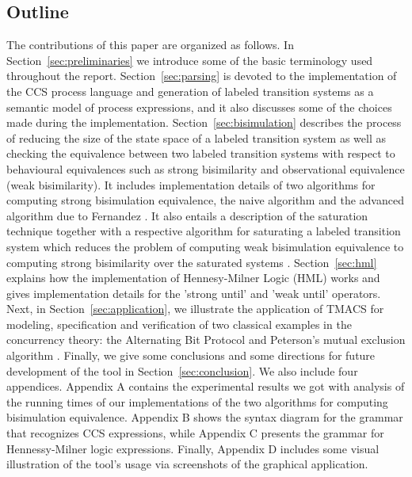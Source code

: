 \subsection{Outline} The contributions of this paper are organized as follows. In Section~\ref{sec:preliminaries} we introduce some of the basic terminology used throughout the report. Section~\ref{sec:parsing} is devoted to the implementation of the CCS process language and generation of labeled transition systems as a semantic model of process expressions, and it also discusses some of the choices made during the implementation. Section~\ref{sec:bisimulation} describes the process of reducing the size of the state space of a labeled transition system as well as checking the equivalence between two labeled transition systems with respect to behavioural equivalences such as strong bisimilarity and observational equivalence (weak bisimilarity). It includes implementation details of two algorithms for computing strong bisimulation equivalence, the naive algorithm \cite{ReactiveSystems} and the advanced algorithm due to Fernandez \cite{Fernandez}. It also entails a description of the saturation technique together with a respective algorithm for saturating a labeled transition system which reduces the problem of computing weak bisimulation equivalence to computing strong bisimilarity over the saturated systems \cite{ReactiveSystems}. Section~\ref{sec:hml} explains how the implementation of Hennesy-Milner Logic (HML) works and gives implementation details for the 'strong until' and 'weak until' operators. Next, in Section~\ref{sec:application}, we illustrate the application of TMACS for modeling, specification and verification of two classical examples in the concurrency theory: the Alternating Bit Protocol \cite{ABP1}\cite{ABP2} and Peterson's mutual exclusion algorithm \cite{Peterson}. Finally, we give some conclusions and some directions for future development of the tool in Section~\ref{sec:conclusion}. We also include four appendices. Appendix A contains the experimental results we got with analysis of the running times of our implementations of the two algorithms for computing bisimulation equivalence. Appendix B shows the syntax diagram for the grammar that recognizes CCS expressions, while Appendix C presents the grammar for Hennessy-Milner logic expressions. Finally, Appendix D includes some visual illustration of the tool's usage via screenshots of the graphical application.
